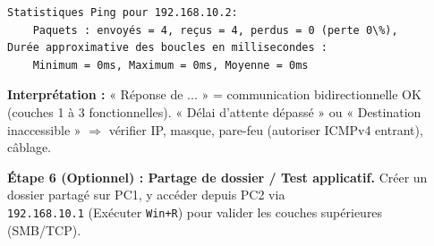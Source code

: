 \documentclass[11pt]{article}
\begin{document}
\begin{experience}
\begin{lstlisting}
Statistiques Ping pour 192.168.10.2:
    Paquets : envoyés = 4, reçus = 4, perdus = 0 (perte 0\%),
Durée approximative des boucles en millisecondes :
    Minimum = 0ms, Maximum = 0ms, Moyenne = 0ms
\end{lstlisting}
\textbf{Interprétation :} « Réponse de ... » = communication bidirectionnelle OK (couches 1 à 3 fonctionnelles). « Délai d'attente dépassé » ou « Destination inaccessible » $\Rightarrow$ vérifier IP, masque, pare-feu (autoriser ICMPv4 entrant), câblage.

\textbf{Étape 6 (Optionnel) : Partage de dossier / Test applicatif.}
Créer un dossier partagé sur PC1, y accéder depuis PC2 via \texttt{\\192.168.10.1} (Exécuter \texttt{Win+R}) pour valider les couches supérieures (SMB/TCP).
\end{experience}
\end{document}
